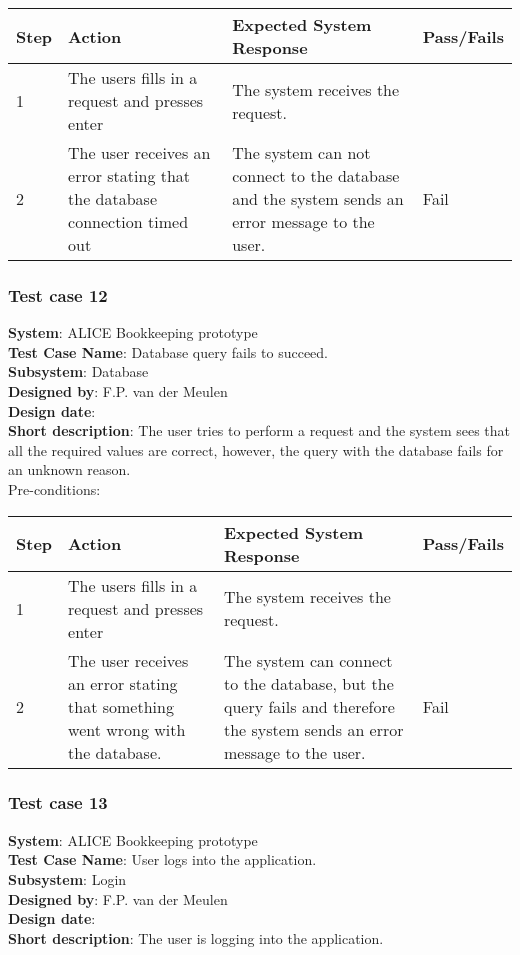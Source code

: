 \begin{longtable}{ | p{0.8cm} | p{4.5cm} | p{6cm} | p{1.5cm} |}
\hline
Step & Action & Expected System Response & Pass/Fails  \\ \hline
1 & The users fills in a request and presses enter  & The system receives the request. &  \\ \hline
2 & The user receives an error stating that the database connection timed out & The system can not connect to the database and the system sends an error message to the user. & Fail \\ \hline
\end{longtable}
\subsubsection{Test case 12}
\textbf{System}:  ALICE Bookkeeping prototype \\
\textbf{Test Case Name}:  Database query fails to succeed. \\
\textbf{Subsystem}:  Database \\
\textbf{Designed by}:  F.P. van der Meulen\\
\textbf{Design date}:  \\
\textbf{Short description}: The user tries to perform a request and the system sees that all the required values are correct, however, the query with the database fails for an unknown reason. \\

Pre-conditions: \\

\begin{longtable}{ | p{0.8cm} | p{4.5cm} | p{6cm} | p{1.5cm} |}
\hline
Step & Action & Expected System Response & Pass/Fails  \\ \hline
1 & The users fills in a request and presses enter  & The system receives the request. &  \\ \hline
2 & The user receives an error stating that something went wrong with the database. & The system can connect to the database, but the query fails and therefore the system sends an error message to the user. & Fail \\ \hline
\end{longtable}

\subsubsection{Test case 13}
\textbf{System}:  ALICE Bookkeeping prototype \\
\textbf{Test Case Name}:  User logs into the application. \\
\textbf{Subsystem}:  Login \\
\textbf{Designed by}:  F.P. van der Meulen\\
\textbf{Design date}:  \\
\textbf{Short description}: The user is logging into the application. \\

